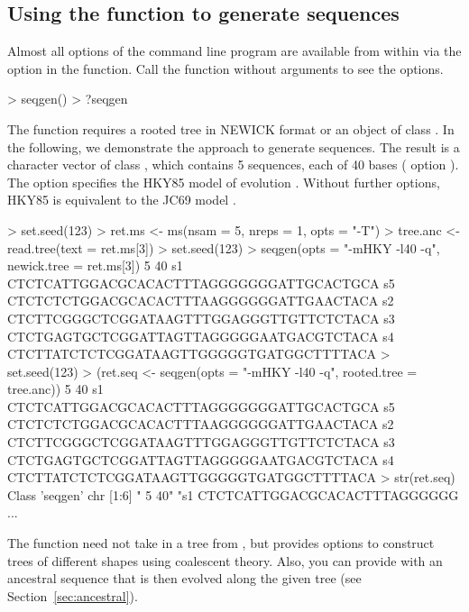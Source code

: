 \subsection[Using the seqgen() function to generate sequences]{Using the  function to generate sequences}
\label{sec:seqgen}

Almost all options of the command line program  are available from within  via
the option  in the  function.
Call the function without arguments to see the options.
\begin{Code}
> seqgen()
> ?seqgen
\end{Code}

The  function requires a rooted tree in NEWICK format or an object of class .
In the following, we demonstrate the  approach
to generate sequences. The result is a character
vector of class {\color{red} }, which contains 5 sequences, 
each of 40 bases ( option ). The option  specifies the HKY85
model of evolution \citep{Hasegawa1985}.
Without further options, HKY85 is equivalent to the JC69 model \citep{Jukes1969}.
\begin{Code}
> set.seed(123)
> ret.ms <- ms(nsam = 5, nreps = 1, opts = "-T")
> tree.anc <- read.tree(text = ret.ms[3])
> set.seed(123)
> seqgen(opts = "-mHKY -l40 -q", newick.tree = ret.ms[3])
 5 40
s1        CTCTCATTGGACGCACACTTTAGGGGGGGATTGCACTGCA
s5        CTCTCTCTGGACGCACACTTTAAGGGGGGATTGAACTACA
s2        CTCTTCGGGCTCGGATAAGTTTGGAGGGTTGTTCTCTACA
s3        CTCTGAGTGCTCGGATTAGTTAGGGGGAATGACGTCTACA
s4        CTCTTATCTCTCGGATAAGTTGGGGGTGATGGCTTTTACA
> set.seed(123)
> (ret.seq <- seqgen(opts = "-mHKY -l40 -q", rooted.tree = tree.anc))
 5 40
s1        CTCTCATTGGACGCACACTTTAGGGGGGGATTGCACTGCA
s5        CTCTCTCTGGACGCACACTTTAAGGGGGGATTGAACTACA
s2        CTCTTCGGGCTCGGATAAGTTTGGAGGGTTGTTCTCTACA
s3        CTCTGAGTGCTCGGATTAGTTAGGGGGAATGACGTCTACA
s4        CTCTTATCTCTCGGATAAGTTGGGGGTGATGGCTTTTACA
> str(ret.seq)
Class 'seqgen'  chr [1:6] " 5 40" "s1        CTCTCATTGGACGCACACTTTAGGGGGG ...
\end{Code}

The  function need not take in a tree from ,
but  provides options to construct trees of
different shapes using coalescent theory.
Also, you can provide  with an ancestral sequence that is then evolved along the given tree (see Section~\ref{sec:ancestral}).





